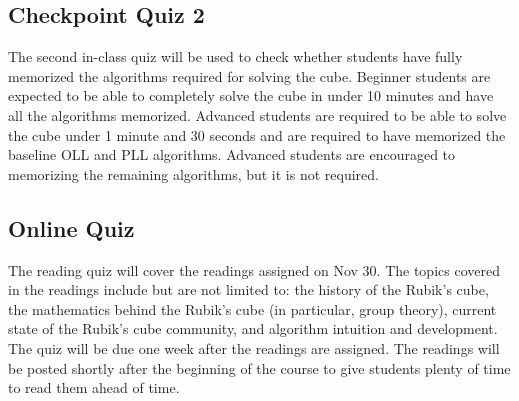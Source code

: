 \documentclass[11pt]{article}
\begin{document}
\subsection*{Checkpoint Quiz 2}
The second in-class quiz will be used to check whether students have fully memorized the algorithms required for solving the cube. Beginner students are expected to be able to completely solve the cube in under 10 minutes and have all the algorithms memorized. Advanced students are required to be able to solve the cube under 1 minute and 30 seconds and are required to have memorized the baseline OLL and PLL algorithms. Advanced students are encouraged to memorizing the remaining algorithms, but it is not required.


\subsection*{Online Quiz}
The reading quiz will cover the readings assigned on Nov 30. The topics covered in the readings include but are not limited to: the history of the Rubik’s cube, the mathematics behind the Rubik’s cube (in particular, group theory), current state of the Rubik’s cube community, and algorithm intuition and development. The quiz will be due one week after the readings are assigned. The readings will be posted shortly after the beginning of the course to give students plenty of time to read them ahead of time.
\end{document}
